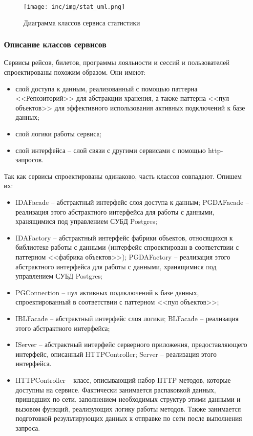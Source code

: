 \begin{figure}[h!]
  \centering
  \texttt{[image: inc/img/stat\_uml.png]}
  \caption{Диаграмма классов сервиса статистики}
  \label{img:stat_uml}
\end{figure}

\newpage
\subsubsection{Описание классов сервисов}

Сервисы рейсов, билетов, программы лояльности и сессий и пользователей спроектированы похожим образом. Они имеют:
\begin{itemize}
    \item слой доступа к данным, реализованный с помощью паттерна <<Репозиторий>> для абстракции хранения, а также паттерна <<пул объектов>> для эффективного использования активных подключений к базе данных;
    \item слой логики работы сервиса;
    \item слой интерфейса -- слой связи с другими сервисами с помощью http-запросов.
\end{itemize}

Так как сервисы спроектированы одинаково, часть классов совпадают. Опишем их:
\begin{itemize}
    \item IDAFacade -- абстрактный интерфейс слоя доступа к данным; PGDAFacade -- реализация этого абстрактного интерфейса для работы с данными, хранящимися под управлением СУБД Postgres;
    \item IDAFactory -- абстрактный интерфейс фабрики объектов, относящихся к библиотеке работы с данными (интерфейс спроектирован в соответствии с паттерном <<фабрика объектов>>); PGDAFactory -- реализация этого абстрактного интерфейса для работы с данными, хранящимися под управлением СУБД Postgres;
    \item PGConnection -- пул активных подлключений к базе данных, спроектированный в соответствии с паттерном <<пул объектов>>;
    \item IBLFacade -- абстрактный интерфейс слоя логики; BLFacade -- реализация этого абстрактного интерфейса;
    \item IServer -- абстрактный интерфейс серверного приложения, предоставляющего интерфейс, описанный HTTPController; Server -- реализация этого интерфейса.
    \item HTTPController -- класс, описывающий набор  HTTP-методов, которые доступны на сервисе. Фактически занимается распаковкой данных, пришедших по сети, заполнением необходимых структур этими данными и вызовом функций, реализующих логику работы методов. Также занимается подготовкой результирующих данных к отправке по сети после выполнения запроса. 
\end{itemize}


